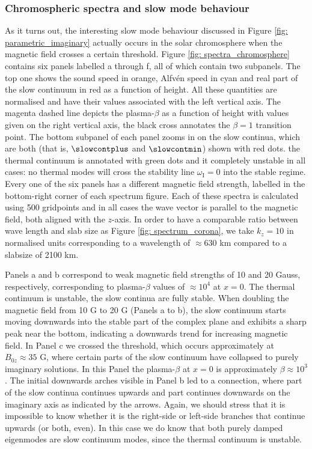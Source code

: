 \subsubsection{Chromospheric spectra and slow mode behaviour}
As it turns out, the interesting slow mode behaviour discussed in Figure \ref{fig: parametric_imaginary} actually occurs in the solar chromosphere when the magnetic field crosses a certain threshold. Figure \ref{fig: spectra_chromosphere} contains six panels labelled a through f, all of which contain two subpanels. The top one shows the sound speed in orange, Alfv\'en speed in cyan and real part of the slow continuum in red as a function of height. All these quantities are normalised and have their values associated with the left vertical axis. The magenta dashed line depicts the plasma-$\beta$ as a function of height with values given on the right vertical axis, the black cross annotates the $\beta = 1$ transition point. The bottom subpanel of each panel zooms in on the slow continua, which are both (that is, $\slowcontplus$ and $\slowcontmin$) shown with red dots. the thermal continuum is annotated with green dots and it completely unstable in all cases: no thermal modes will cross the stability line $\omega_\text{I} = 0$ into the stable regime. Every one of the six panels has a different magnetic field strength, labelled in the bottom-right corner of each spectrum figure. Each of these spectra is calculated using 500 gridpoints and in all cases the wave vector is parallel to the magnetic field, both aligned with the $z$-axis. In order to have a comparable ratio between wave length and slab size as Figure \ref{fig: spectrum_corona}, we take $k_z = 10$ in normalised units corresponding to a wavelength of $\approx 630$ km compared to a slabsize of 2100 km.

Panels a and b correspond to weak magnetic field strengths of 10 and 20 Gauss, respectively, corresponding to plasma-$\beta$ values of $\approx 10^4$ at $x = 0$. The thermal continuum is unstable, the slow continua are fully stable. When doubling the magnetic field from 10 G to 20 G (Panels a to b), the slow continuum starts moving downwards into the stable part of the complex plane and exhibits a sharp peak near the bottom, indicating a downwards trend for increasing magnetic field. In Panel c we crossed the threshold, which occurs approximately at $B_{0z} \approx 35$ G, where certain parts of the slow continuum have collapsed to purely imaginary solutions. In this Panel the plasma-$\beta$ at $x=0$ is approximately $\beta \approx 10^3$. The initial downwards arches visible in Panel b led to a connection, where part of the slow continua continues upwards and part continues downwards on the imaginary axis as indicated by the arrows. Again, we should stress that it is impossible to know whether it is the right-side or left-side branches that continue upwards (or both, even). In this case we do know that both purely damped eigenmodes are slow continuum modes, since the thermal continuum is unstable.

